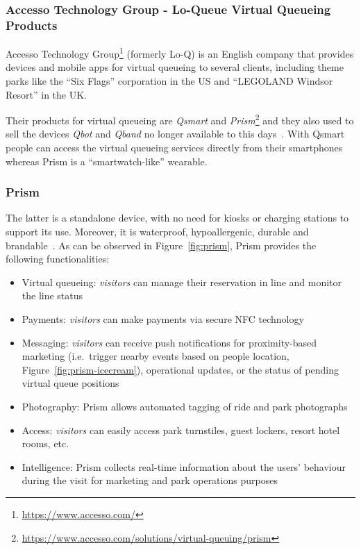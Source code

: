 \subsubsection{Accesso Technology Group - Lo-Queue Virtual Queueing Products}
Accesso Technology Group\footnote{\url{https://www.accesso.com/}} (formerly Lo-Q) is an English company that provides
devices and mobile apps for virtual queueing to several clients, including theme parks like the ``Six Flags'' corporation in the US
and ``LEGOLAND Windsor Resort'' in the UK\@.

Their products for virtual queueing are \textit{Qsmart} and \textit{Prism}\footnote{\url{https://www.accesso.com/solutions/virtual-queuing/prism}}
and they also used to sell the devices \textit{Qbot} and \textit{Qband} no longer available to this days~\cite{accesso-wikipedia}.
With Qsmart people can access the virtual queueing services directly from their smartphones whereas Prism is a ``smartwatch-like''
wearable.

\subsubsection*{Prism}
The latter is a standalone device, with no need for kiosks or charging stations to support its use.
Moreover, it is waterproof, hypoallergenic, durable and brandable~\cite{prism-desc}.
As can be observed in Figure~\ref{fig:prism}, Prism provides the following functionalities:
\begin{itemize}
    \item Virtual queueing: \textit{visitors} can manage their reservation in line and monitor the line status
    \item Payments: \textit{visitors} can make payments via secure NFC technology
    \item Messaging: \textit{visitors} can receive push notifications for proximity-based marketing (i.e.\ trigger nearby events based on people location, Figure~\ref{fig:prism-icecream}), operational updates, or the status of pending virtual queue positions
    \item Photography: Prism allows automated tagging of ride and park photographs
    \item Access: \textit{visitors} can easily access park turnstiles, guest lockers, resort hotel rooms, etc.
    \item Intelligence: Prism collects real-time information about the users' behaviour during the visit for marketing and park operations purposes
\end{itemize}


